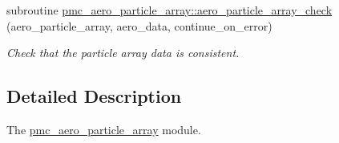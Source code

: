 \begin{DoxyCompactItemize}
subroutine \mbox{\hyperlink{namespacepmc__aero__particle__array_a6f4a60d073f866cb41a593de26778dd3}{pmc\+\_\+aero\+\_\+particle\+\_\+array\+::aero\+\_\+particle\+\_\+array\+\_\+check}} (aero\+\_\+particle\+\_\+array, aero\+\_\+data, continue\+\_\+on\+\_\+error)
\begin{DoxyCompactList}\small\item\em Check that the particle array data is consistent. \end{DoxyCompactList}\end{DoxyCompactItemize}


\subsection{Detailed Description}
The \mbox{\hyperlink{namespacepmc__aero__particle__array}{pmc\+\_\+aero\+\_\+particle\+\_\+array}} module. 


